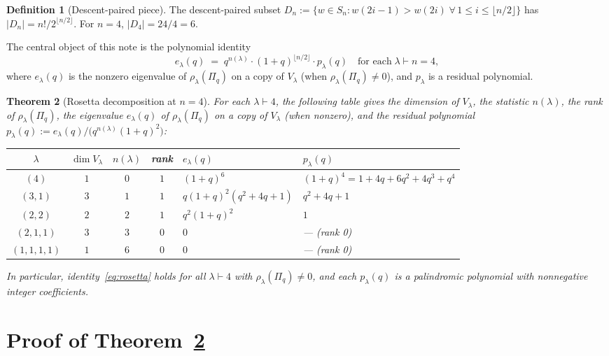 \documentclass[11pt]{article}
\newtheorem{theorem}{Theorem}
\theoremstyle{definition}
\newtheorem{definition}[theorem]{Definition}
\begin{document}
\begin{definition}[Descent-paired piece]
The descent-paired subset
$D_n := \{ w \in S_n : w(2i-1) > w(2i) \; \forall\, 1 \leq i \leq \lfloor n/2\rfloor\}$
has $|D_n| = n!/2^{\lfloor n/2\rfloor}$. For $n=4$, $|D_4| = 24/4 = 6$.
\end{definition}

The central object of this note is the polynomial identity
\begin{equation}\label{eq:rosetta}
e_\lambda(q) \;=\; q^{n(\lambda)} \cdot (1+q)^{\lfloor n/2 \rfloor}
\cdot p_\lambda(q)
\quad\text{for each}\; \lambda\vdash n=4,
\end{equation}
where $e_\lambda(q)$ is the nonzero eigenvalue of $\rho_\lambda(\Pi_q)$ on
a copy of $V_\lambda$ (when $\rho_\lambda(\Pi_q) \ne 0$), and $p_\lambda$
is a residual polynomial.

\begin{theorem}[Rosetta decomposition at $n=4$]\label{thm:main}
For each $\lambda \vdash 4$, the following table gives the dimension of
$V_\lambda$, the statistic $n(\lambda)$, the rank of $\rho_\lambda(\Pi_q)$,
the eigenvalue $e_\lambda(q)$ of $\rho_\lambda(\Pi_q)$ on a copy of
$V_\lambda$ (when nonzero), and the residual polynomial
$p_\lambda(q) := e_\lambda(q) / \bigl(q^{n(\lambda)}(1+q)^{2}\bigr)$:
\begin{center}
\renewcommand{\arraystretch}{1.25}
\begin{tabular}{c|c|c|c|l|l}
$\lambda$ & $\dim V_\lambda$ & $n(\lambda)$ & rank & $e_\lambda(q)$ & $p_\lambda(q)$ \\\hline
$(4)$     & $1$ & $0$ & $1$ & $(1+q)^6$             & $(1+q)^4 = 1+4q+6q^2+4q^3+q^4$ \\
$(3,1)$   & $3$ & $1$ & $1$ & $q(1+q)^2(q^2+4q+1)$  & $q^2+4q+1$ \\
$(2,2)$   & $2$ & $2$ & $1$ & $q^2(1+q)^2$          & $1$ \\
$(2,1,1)$ & $3$ & $3$ & $0$ & $0$                   & --- (rank 0) \\
$(1,1,1,1)$ & $1$ & $6$ & $0$ & $0$                 & --- (rank 0) \\
\end{tabular}
\end{center}
In particular, identity~\eqref{eq:rosetta} holds for all $\lambda \vdash 4$
with $\rho_\lambda(\Pi_q) \ne 0$, and each $p_\lambda(q)$ is a palindromic
polynomial with nonnegative integer coefficients.
\end{theorem}

\section{Proof of Theorem~\ref{thm:main}}
\end{document}
